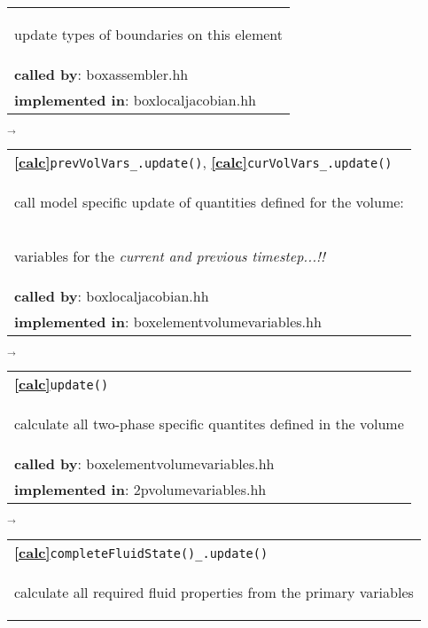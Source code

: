 \begin{landscape}
{\begin{tabular}{|l|}
     \begin{scriptsize}update types of boundaries on this element\end{scriptsize}\\
      \textbf{called by}: boxassembler.hh\\
      \textbf{implemented in}:  boxlocaljacobian.hh\\  
	\hline
  \end{tabular}
    $\overrightarrow{
    }$
    \begin{tabular}{|l|}
      \hline
      \textbf{\textcircled{\ref{calc}}}\verb+prevVolVars_.update()+, \textbf{\textcircled{\ref{calc}}}\verb+curVolVars_.update()+ \\
    \begin{scriptsize}call model specific update of quantities defined for the volume:\end{scriptsize}\\
    \begin{scriptsize}variables for the \emph{current and previous timestep...!!}\end{scriptsize}\\
      \textbf{called by}: boxlocaljacobian.hh\\
      \textbf{implemented in}: boxelementvolumevariables.hh\\  
	\hline
  \end{tabular}
\nextline
    $\overrightarrow{
    }$
    \begin{tabular}{||l||}
      \hline\hline
      \textbf{\textcircled{\ref{calc}}}\verb+update()+ \\
    \begin{scriptsize}calculate all two-phase specific quantites defined in the volume\end{scriptsize}\\
      \textbf{called by}: boxelementvolumevariables.hh\\
      \textbf{implemented in}: 2pvolumevariables.hh\\  
	\hline\hline
  \end{tabular}
    $\overrightarrow{
    }$
      \begin{tabular}{||l||}
\hline\hline
      \textbf{\textcircled{\ref{calc}}}\verb+completeFluidState()_.update()+ \\
      \begin{scriptsize}calculate all required fluid properties from the primary variables\end{scriptsize}\\

\end{tabular}}
\end{landscape}
